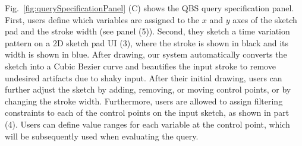Fig.~\ref{fig:querySpecificationPanel} (C) shows the QBS query specification panel.
First, users define which variables are assigned to the $x$ and $y$ axes of the sketch pad and the stroke width (see panel (5)).
Second, they sketch a time variation pattern on a 2D sketch pad UI (3),
where the stroke is shown in black and its width is shown in blue.
After drawing, our system automatically converts the sketch into a Cubic Bezier curve and beautifies the input stroke to remove undesired artifacts due to shaky input. 
After their initial drawing, users can further adjust the sketch
by adding, removing, or moving control points, or by changing the stroke width.
Furthermore, users are allowed to assign filtering constraints to each of the control points on the input sketch, as shown in part (4).
Users can define value ranges for each variable at the control point, which will be subsequently used when evaluating the query.


